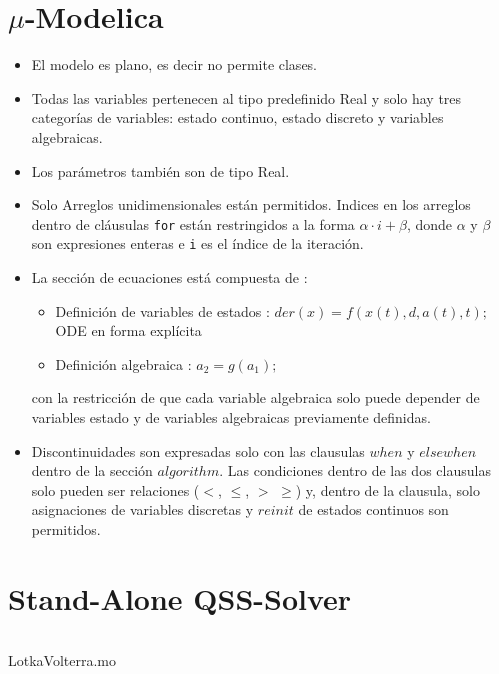 \documentclass{beamer}
\begin{document}
\section{$\mu$-Modelica}
\begin{frame}
	\begin{itemize}
	 \item El modelo es plano, es decir no permite clases.
	 \item Todas las variables pertenecen al tipo predefinido Real y solo hay tres categorías de variables: estado continuo, estado discreto y variables 
	algebraicas.
	 \item Los parámetros también son de tipo Real. 
	 \item 
     
    Solo Arreglos unidimensionales están permitidos. Indices en los arreglos dentro de cláusulas \texttt{for} están restringidos a la forma $\alpha \cdot i + \beta$, 
	donde $\alpha$ y $\beta$ son expresiones enteras e \texttt{i} es el índice de la iteración.
	 \item La sección de ecuaciones está compuesta de :
	 \begin{itemize}
		\item Definición de variables de estados : $der(x) =  f (x(t), d, a(t), t);$ ODE en forma explícita
		\item Definición algebraica : $a_2  = g(a_1);$
	 \end{itemize}
	 con la restricción de que cada variable algebraica solo puede depender de variables estado y de variables algebraicas previamente definidas.
	 
	 \item Discontinuidades son expresadas solo con las clausulas $when$ y $elsewhen$ dentro de la sección $algorithm$. Las condiciones dentro de las dos 
	clausulas solo pueden ser relaciones ($<$, $\leqslant$, $>$ $\geqslant$) y, dentro de la clausula, solo asignaciones de variables discretas y $reinit$ 
	de estados continuos son permitidos.
	\end{itemize}
\end{frame}

\section{Stand-Alone QSS-Solver}
\begin{frame}
	\begin{listing}[H]    
		\inputminted[linenos]{modelica}{src/lotka_volterra_qss.mo}
		\caption{LotkaVolterra.mo}\label{lst:LotkaVolterra_qss.mo}
	\end{listing} 
\end{frame}
\end{document}

